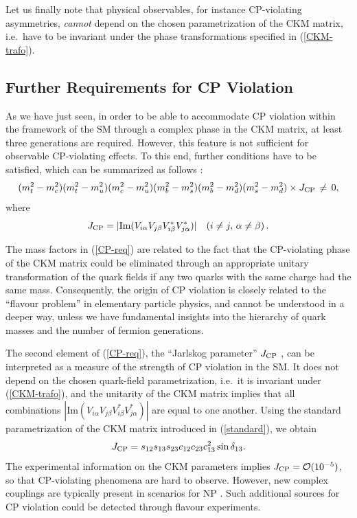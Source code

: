 \documentclass[12pt]{article}
\begin{document}
Let us finally note that physical observables, for instance CP-violating
asymmetries, {\it cannot} depend on the chosen parametrization of the CKM 
matrix, i.e.\ have to be invariant under the phase transformations specified 
in (\ref{CKM-trafo}). 


%
%
%
\subsection{Further Requirements for CP Violation}
%
%
%
As we have just seen, in order to be able to accommodate CP violation within 
the framework of the SM through a complex phase in the CKM matrix, at least 
three generations are required. However, this feature is not sufficient for 
observable CP-violating effects. To this end, further conditions have to 
be satisfied, which can be summarized as follows \cite{jarlskog,BBG}:
\begin{equation}\label{CP-req}
(m_t^2-m_c^2)(m_t^2-m_u^2)(m_c^2-m_u^2)
(m_b^2-m_s^2)(m_b^2-m_d^2)(m_s^2-m_d^2)\times J_{\rm CP}\,\not=\,0,
\end{equation}
where
\begin{equation}\label{JCP}
J_{\rm CP}=|\mbox{Im}(V_{i\alpha}V_{j\beta}V_{i\beta}^\ast 
V_{j\alpha}^\ast)|\quad(i\not=j,\,\alpha\not=\beta)\,.
\end{equation}

The mass factors in (\ref{CP-req}) are related to the fact that the 
CP-violating phase of the CKM matrix could be eliminated through an 
appropriate unitary transformation of the quark fields if any two quarks 
with the same charge had the same mass. Consequently, the origin 
of CP violation is closely related to the ``flavour problem'' in
elementary particle physics, and cannot be understood in a deeper 
way, unless we have fundamental insights into the hierarchy of quark 
masses and the number of fermion generations.

The second element of (\ref{CP-req}), the ``Jarlskog parameter'' 
$J_{\rm CP}$ \cite{jarlskog}, can be interpreted as a measure of the 
strength of CP violation in the SM. It does not depend on the chosen 
quark-field parametrization, i.e.\ it is invariant under (\ref{CKM-trafo}), 
and the unitarity of the CKM matrix implies that all combinations 
$|\mbox{Im}(V_{i\alpha}V_{j\beta}V_{i\beta}^\ast V_{j\alpha}^\ast)|$ 
are equal to one another. Using the standard parametrization of the
CKM matrix introduced in (\ref{standard}), we obtain
\begin{equation}\label{JCP-PDG}
J_{\rm CP}=s_{12}s_{13}s_{23}c_{12}c_{23}c_{13}^2\sin\delta_{13}.
\end{equation}
The  experimental information on the CKM parameters implies 
$J_{\rm CP}={\cal O}(10^{-5})$, so that
CP-violating phenomena are hard to observe.  However, new complex couplings 
are typically present in scenarios for NP \cite{ellis}. Such additional sources
for CP violation could be detected through flavour experiments. 
\end{document}
